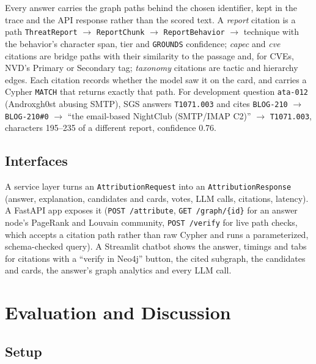 \documentclass[conference]{IEEEtran}
\newcommand{\id}[1]{\texttt{#1}}
\begin{document}
Every answer carries the graph paths behind the chosen identifier, kept in the trace and the API response rather than the scored text. A \emph{report} citation is a path \texttt{ThreatReport} $\rightarrow$ \texttt{ReportChunk} $\rightarrow$ \texttt{ReportBehavior} $\rightarrow$ technique with the behavior's character span, tier and \texttt{GROUNDS} confidence; \emph{capec} and \emph{cve} citations are bridge paths with their similarity to the passage and, for CVEs, NVD's Primary or Secondary tag; \emph{taxonomy} citations are tactic and hierarchy edges. Each citation records whether the model saw it on the card, and carries a Cypher \texttt{MATCH} that returns exactly that path. For development question \texttt{ata-012} (Androxgh0st abusing SMTP), SGS answers \id{T1071.003} and cites
\texttt{BLOG-210} $\rightarrow$ \texttt{BLOG-210\#0} $\rightarrow$ ``the email-based NightClub (SMTP/IMAP C2)'' $\rightarrow$ \id{T1071.003}, characters 195--235 of a different report, confidence 0.76.

\subsection{Interfaces}

A service layer turns an \texttt{AttributionRequest} into an \texttt{AttributionResponse} (answer, explanation, candidates and cards, votes, LLM calls, citations, latency). A FastAPI app exposes it (\texttt{POST /attribute}, \texttt{GET /graph/\{id\}} for an answer node's PageRank and Louvain community, \texttt{POST /verify} for live path checks, which accepts a citation path rather than raw Cypher and runs a parameterized, schema-checked query). A Streamlit chatbot shows the answer, timings and tabs for citations with a ``verify in Neo4j'' button, the cited subgraph, the candidates and cards, the answer's graph analytics and every LLM call.

\section{Evaluation and Discussion}\label{sec:eval}

\subsection{Setup}
\end{document}
